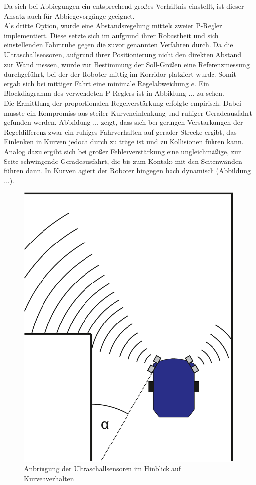\documentclass[12pt,a4paper,oneside]{article}
\begin{document}
\begin{spacing}{1.15}
Da sich bei Abbiegungen ein entsprechend großes Verhältnis einstellt, ist dieser Ansatz auch für Abbiegevorgänge geeignet. \\
Als dritte Option, wurde eine Abstandsregelung mittels zweier P-Regler implementiert. Diese setzte sich im aufgrund ihrer Robustheit und sich einstellenden Fahrtruhe gegen die zuvor genannten Verfahren durch. Da die Ultraschallsensoren, aufgrund ihrer Positionierung nicht den direkten Abstand zur Wand messen, wurde zur Bestimmung der Soll-Größen eine Referenzmessung durchgeführt, bei der der Roboter mittig im Korridor platziert wurde. Somit ergab sich bei mittiger Fahrt eine minimale Regelabweichung $e$. Ein Blockdiagramm des verwendeten P-Reglers ist in Abbildung ... zu sehen.\\
Die Ermittlung der proportionalen Regelverstärkung erfolgte empirisch. Dabei musste ein Kompromiss aus steiler Kurveneinlenkung und ruhiger Geradeausfahrt gefunden werden. Abbildung ... zeigt, dass sich bei geringen Verstärkungen der Regeldifferenz zwar ein ruhiges Fahrverhalten auf gerader Strecke ergibt, das Einlenken in Kurven jedoch durch zu träge ist und zu Kollisionen führen kann. Analog dazu ergibt sich bei großer Fehlerverstärkung eine ungleichmäßige, zur Seite schwingende Geradeausfahrt, die bis zum Kontakt mit den Seitenwänden führen dann. In Kurven agiert der Roboter hingegen hoch dynamisch (Abbildung ...).

\begin{figure}[!htb]
	\centering
	\includegraphics[scale=.3]{figs/kurve}
	\caption{Anbringung der Ultraschallsensoren im Hinblick auf Kurvenverhalten}
	\label{fig:kurve}
\end{figure}


\end{spacing}
\end{document}
